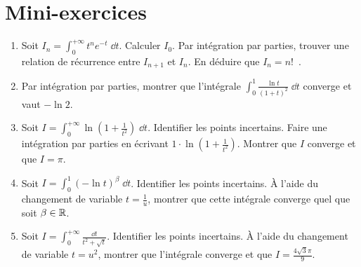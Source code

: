 \section*{Mini-exercices}

\begin{frame}
\begin{miniexercice}
\begin{enumerate}
  \item Soit $I_n = \int_0^{+\infty} t^n e^{-t}\;\dd t$. 
  Calculer $I_0$. Par intégration par parties, trouver une relation de 
  récurrence entre $I_{n+1}$ et $I_n$. En déduire que $I_n = n!$\ .
  
  \item Par intégration par parties, montrer que l'intégrale
  $\int_0^1 \frac{\ln t}{(1+t)^2}\; \dd t$ converge et vaut $-\ln 2$.
  
  \item Soit $I= \int_0^{+\infty} \ln(1+\frac{1}{t^2}) \;\dd t$. Identifier les points incertains.
  Faire une intégration par parties en écrivant $1\cdot \ln(1+\frac{1}{t^2})$. Montrer que $I$ converge
  et que $I = \pi$. 
  
  \item Soit $I=\int_0^1 \left(-\ln t\right)^\beta \;\dd t$.
  Identifier les points incertains. 
  \`A l'aide du changement de variable $t=\frac 1u$, montrer que cette intégrale
  converge quel que soit $\beta \in \mathbb{R}$.
  
  \item Soit $I=\int_0^{+\infty}\frac{\dd t}{t^2+\sqrt t}$.
  Identifier les points incertains. 
  \`A l'aide du changement de variable $t=u^2$, montrer que l'intégrale
  converge et que $I = \frac{4\sqrt3\pi}{9}$.


\end{enumerate}
\end{miniexercice}	
\end{frame}






